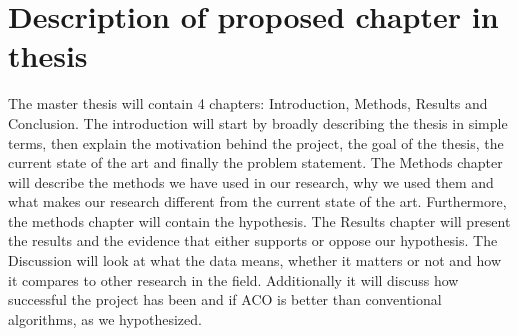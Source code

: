 \chapter{Description of proposed chapter in thesis}
\label{ch:discription}


The master thesis will contain 4 chapters: Introduction, Methods, Results and Conclusion.
The introduction will start by broadly describing the thesis in simple terms, then explain the motivation behind the project,
the goal of the thesis, the current state of the art and finally the problem statement. 
The Methods chapter will describe the methods we have used in our research, why we used them and what makes
our research different from the current state of the art. Furthermore, the methods chapter will contain the hypothesis.
The Results chapter will present the results and the evidence that either supports or oppose our hypothesis.
The Discussion will look at what the data means, whether it matters or not and how it compares to other research in the field.
Additionally it will discuss how successful the project has been and if ACO is better than conventional algorithms, as we hypothesized.